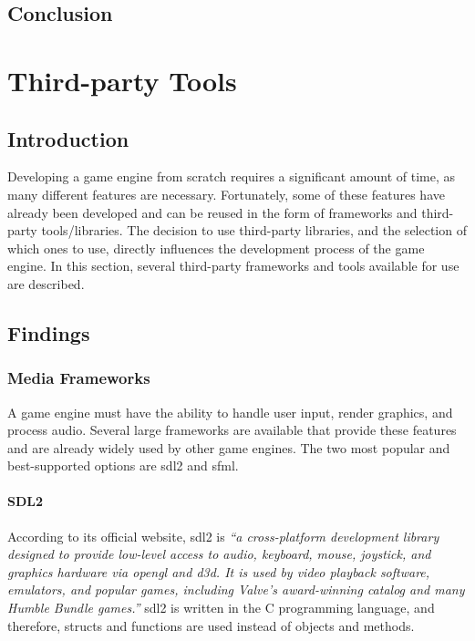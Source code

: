 \documentclass{projdoc}
\begin{document}
\subsection{Conclusion}

\section{Third-party Tools}

\subsection{Introduction}

Developing a game engine from scratch requires a significant amount of time, as many
different features are necessary. Fortunately, some of these features have already
been developed and can be reused in the form of frameworks and third-party
tools/libraries. The decision to use third-party libraries, and the selection of
which ones to use, directly influences the development process of the game engine. In
this section, several third-party frameworks and tools available for use are
described.

\subsection{Findings}

\subsubsection{Media Frameworks}

A game engine must have the ability to handle user input, render graphics, and
process audio. Several large frameworks are available that provide these features and
are already widely used by other game engines. The two most popular and
best-supported options are \gls{sdl2} and \gls{sfml}.

\paragraph{SDL2}

According to its official website, \gls{sdl2} is \emph{``a cross-platform development
library designed to provide low-level access to audio, keyboard, mouse, joystick, and
graphics hardware via \gls{opengl} and \gls{d3d}. It is used by video playback
software, emulators, and popular games, including Valve's award-winning catalog and
many Humble Bundle games.''} \gls{sdl2} is written in the C programming language, and
therefore, structs and functions are used instead of objects and methods.
\end{document}
